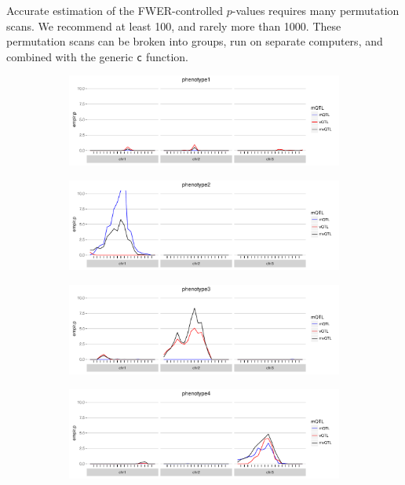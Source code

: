 \documentclass[9pt,twocolumn,twoside]{gsag3jnl}
\begin{document}
Accurate estimation of the FWER-controlled $p$-values requires many permutation scans.
We recommend at least 100, and rarely more than 1000.
These permutation scans can be broken into groups, run on separate computers, and combined with the generic \texttt{c} function.

\begin{figure}
    \begin{subfigure}{0.5\textwidth}
        \includegraphics[width=\textwidth]{images/empir_p_scan_phen1.pdf}
    \end{subfigure}

    \begin{subfigure}[b]{0.5\textwidth}
        \includegraphics[width=\textwidth]{images/empir_p_scan_phen2.pdf}
    \end{subfigure}

    \begin{subfigure}[b]{0.5\textwidth}
        \includegraphics[width=\textwidth]{images/empir_p_scan_phen3.pdf}
    \end{subfigure}
    
    \begin{subfigure}[b]{0.5\textwidth}
        \includegraphics[width=\textwidth]{images/empir_p_scan_phen4.pdf}
    \end{subfigure}
    

\end{figure}
\end{document}
